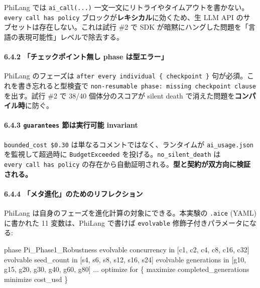 \documentclass[
]{ltjsarticle}
\newenvironment{Shaded}{}{}
\newcommand{\NormalTok}[1]{#1}
\begin{document}
PhiLang では \texttt{ai\_call(...)}
一文一文にリトライやタイムアウトを書かない。\texttt{every\ call\ has\ policy}
ブロックが\textbf{レキシカル}に効くため、生 LLM API
のサブセットは存在しない。これは試行 \#2 で SDK
が暗黙にハングした問題を「言語の表現可能性」レベルで除去する。

\paragraph{6.4.2 「チェックポイント無し phase
は型エラー」}\label{ux30c1ux30a7ux30c3ux30afux30ddux30a4ux30f3ux30c8ux7121ux3057-phase-ux306fux578bux30a8ux30e9ux30fc}

PhiLang のフェーズは
\texttt{after\ every\ individual\ \{\ checkpoint\ \}}
句が必須。これを書き忘れると型検査で
\texttt{non-resumable\ phase:\ missing\ checkpoint\ clause} を出す。試行
\#2 で 38/40 個体分のスコアが silent death
で消えた問題を\textbf{コンパイル時}に防ぐ。

\paragraph{\texorpdfstring{6.4.3 \texttt{guarantees} 節は実行可能
invariant}{6.4.3 guarantees 節は実行可能 invariant}}\label{guarantees-ux7bc0ux306fux5b9fux884cux53efux80fd-invariant}

\texttt{bounded\_cost\ \$0.30} は単なるコメントではなく、ランタイムが
\texttt{ai\_usage.json} を監視して超過時に \texttt{BudgetExceeded}
を投げる。\texttt{no\_silent\_death} は
\texttt{every\ call\ has\ policy}
の存在から自動証明される。\textbf{型と契約が双方向に検証される。}

\paragraph{6.4.4
「メタ進化」のためのリフレクション}\label{ux30e1ux30bfux9032ux5316ux306eux305fux3081ux306eux30eaux30d5ux30ecux30afux30b7ux30e7ux30f3}

PhiLang は自身のフェーズを進化計算の対象にできる。本実験の
\texttt{.aice} (YAML) に書かれた 11 変数は、PhiLang で書けば
\texttt{evolvable} 修飾子付きパラメータになる:

\begin{Shaded}
\begin{Highlighting}[]
\NormalTok{phase Pi\_Phase1\_Robustness}
\NormalTok{  evolvable concurrency  in [c1, c2, c4, c8, c16, c32]}
\NormalTok{  evolvable seed\_count   in [s4, s6, s8, s12, s16, s24]}
\NormalTok{  evolvable generations  in [g10, g15, g20, g30, g40, g60, g80]}
\NormalTok{  ...}
\NormalTok{  optimize for \{}
\NormalTok{     maximize completed\_generations}
\NormalTok{     minimize cost\_usd}
\NormalTok{  \}}
\end{Highlighting}
\end{Shaded}
\end{document}
